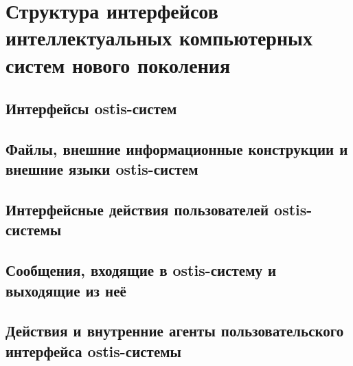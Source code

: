 \chapter{Структура интерфейсов интеллектуальных компьютерных систем нового поколения}
\label{chapter_interfaces}


\section{Интерфейсы ostis-систем}
\section{Файлы, внешние информационные конструкции и внешние языки ostis-систем}
\section{Интерфейсные действия пользователей ostis-системы}
\section{Сообщения, входящие в ostis-систему и выходящие из неё}
\section{Действия и внутренние агенты пользовательского интерфейса ostis-системы}

%